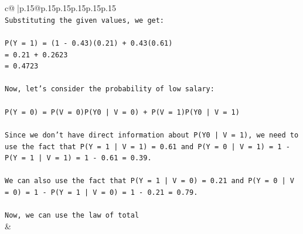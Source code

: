 \documentclass{article}
\begin{document}
{\begin{supertabular}{c@{$\;$}|p{.15\linewidth}@{}p{.15\linewidth}p{.15\linewidth}p{.15\linewidth}p{.15\linewidth}p{.15\linewidth}}
{{{\\ 
\texttt{Substituting the given values, we get:} \\
\\ 
\texttt{P(Y = 1) = (1 {-} 0.43)(0.21) + 0.43(0.61)} \\
\texttt{= 0.21 + 0.2623} \\
\texttt{= 0.4723} \\
\\ 
\texttt{Now, let's consider the probability of low salary:} \\
\\ 
\texttt{P(Y = 0) = P(V = 0)P(Y0 | V = 0) + P(V = 1)P(Y0 | V = 1)} \\
\\ 
\texttt{Since we don't have direct information about P(Y0 | V = 1), we need to use the fact that P(Y = 1 | V = 1) = 0.61 and P(Y = 0 | V = 1) = 1 {-} P(Y = 1 | V = 1) = 1 {-} 0.61 = 0.39.} \\
\\ 
\texttt{We can also use the fact that P(Y = 1 | V = 0) = 0.21 and P(Y = 0 | V = 0) = 1 {-} P(Y = 1 | V = 0) = 1 {-} 0.21 = 0.79.} \\
\\ 
\texttt{Now, we can use the law of total} \\
            }
        }
    }
    & \\ \\


\end{supertabular}}
\end{document}
